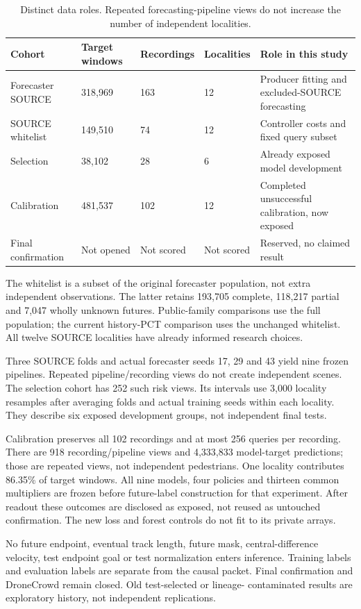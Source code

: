 \documentclass[10pt,twocolumn,letterpaper]{article}
\begin{document}
\begin{table}[!t]\centering\small
\begin{tabularx}{\textwidth}{@{}XXXXX@{}}\toprule
Cohort & Target windows & Recordings & Localities & Role in this study \\
\midrule
Forecaster SOURCE & 318,969 & 163 & 12 & Producer fitting and excluded-SOURCE forecasting \\
SOURCE whitelist & 149,510 & 74 & 12 & Controller costs and fixed query subset \\
Selection & 38,102 & 28 & 6 & Already exposed model development \\
Calibration & 481,537 & 102 & 12 & Completed unsuccessful calibration, now exposed \\
Final confirmation & Not opened & Not scored & Not scored & Reserved, no claimed result \\
\bottomrule\end{tabularx}
\caption{Distinct data roles. Repeated forecasting-pipeline views do not increase the number of independent localities.}\end{table}
The whitelist is a subset of the original forecaster population, not extra
independent observations. The latter retains 193,705 complete, 118,217 partial
and 7,047 wholly unknown futures. Public-family comparisons use the full
population; the current history-PCT comparison uses the unchanged whitelist.
All twelve SOURCE localities have already informed research choices.

Three SOURCE folds and actual forecaster seeds 17, 29 and 43 yield nine frozen
pipelines. Repeated pipeline/recording views do not create independent scenes.
The selection cohort has 252 such risk views. Its intervals use 3,000 locality
resamples after averaging folds and actual training seeds within each locality.
They describe six exposed development groups, not independent final tests.

Calibration preserves all 102 recordings and at most 256 queries per recording.
There are 918 recording/pipeline views and 4,333,833 model-target predictions; those
are repeated views, not independent pedestrians. One locality contributes
86.35\% of target windows. All nine models, four policies and thirteen common
multipliers are frozen before future-label construction for that experiment.
After readout these outcomes are disclosed as exposed, not reused as untouched
confirmation. The new loss and forest controls do not fit to its private arrays.

No future endpoint, eventual track length, future mask, central-difference
velocity, test endpoint goal or test normalization enters inference. Training
labels and evaluation labels are separate from the causal packet. Final
confirmation and DroneCrowd remain closed. Old test-selected or lineage-
contaminated results are exploratory history, not independent replications.
\end{document}
